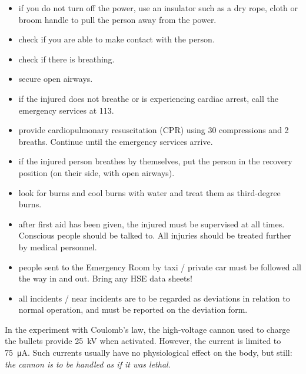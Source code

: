 \documentclass[../Elmag-labhefte-2022.tex]{subfiles}
\begin{document}
\begin{enumerate}
\begin{itemize}
        \item if you do not turn off the power, use an insulator such as a dry rope, cloth or broom handle to pull the person away from the power.
        \item check if you are able to make contact with the person.
        \item check if there is breathing.
        \item secure open airways.
        \item if the injured does not breathe or is experiencing cardiac arrest, call the emergency services at 113.
        \item provide cardiopulmonary resuscitation (CPR) using 30 compressions and 2 breaths. Continue until the emergency services arrive.
        \item if the injured person breathes by themselves, put the person in the recovery position (on their side, with open airways).
        \item look for burns and cool burns with water and treat them as third-degree burns.
        \item after first aid has been given, the injured must be supervised at all times. Conscious people should be talked to. All injuries should be treated further by medical personnel.
        \item people sent to the Emergency Room by taxi / private car must be followed all the way in and out. Bring any HSE data sheets!
        \item all incidents / near incidents are to be regarded as deviations in relation to normal operation, and must be reported on the deviation form.
    \end{itemize}
\end{enumerate}

In the experiment with Coulomb's law, the high-voltage cannon used to charge the bullets provide \SI{25}{\kilo\V} when activated. However, the current is limited to \SI{75}{\micro\ampere}. Such currents usually have no physiological effect on the body, but still: \textit{the cannon is to be handled as if it was lethal}.
\end{document}
